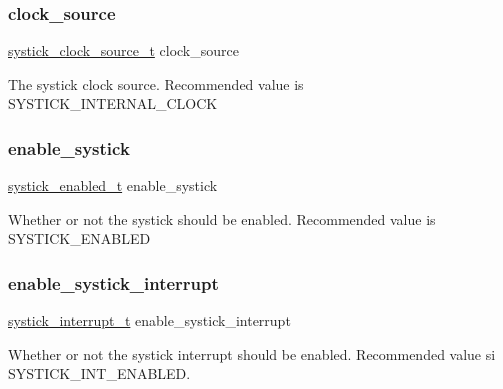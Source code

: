 \subsubsection{\texorpdfstring{clock\+\_\+source}{clock\_source}}
{\footnotesize\ttfamily \hyperlink{systick__stm32f411__config_8h_a39469603d3120252cd4f82defbd9525e}{systick\+\_\+clock\+\_\+source\+\_\+t} clock\+\_\+source}

The systick clock source. Recommended value is S\+Y\+S\+T\+I\+C\+K\+\_\+\+I\+N\+T\+E\+R\+N\+A\+L\+\_\+\+C\+L\+O\+CK \mbox{\label{structsystick__config__t_a072e52389584956edd057c591c1c7cd8}} 
\subsubsection{\texorpdfstring{enable\+\_\+systick}{enable\_systick}}
{\footnotesize\ttfamily \hyperlink{systick__stm32f411__config_8h_a54abff3d12292257e357d04094ebc415}{systick\+\_\+enabled\+\_\+t} enable\+\_\+systick}

Whether or not the systick should be enabled. Recommended value is S\+Y\+S\+T\+I\+C\+K\+\_\+\+E\+N\+A\+B\+L\+ED \mbox{\label{structsystick__config__t_ae4174393003a47f219770a2e5793de45}} 
\subsubsection{\texorpdfstring{enable\+\_\+systick\+\_\+interrupt}{enable\_systick\_interrupt}}
{\footnotesize\ttfamily \hyperlink{systick__stm32f411__config_8h_a82589cfda6cc55b21d80e5e3f47b69d9}{systick\+\_\+interrupt\+\_\+t} enable\+\_\+systick\+\_\+interrupt}

Whether or not the systick interrupt should be enabled. Recommended value si S\+Y\+S\+T\+I\+C\+K\+\_\+\+I\+N\+T\+\_\+\+E\+N\+A\+B\+L\+ED. \mbox{\label{structsystick__config__t_a5d1767c41ce5e869439e7197fd6a7373}} 
